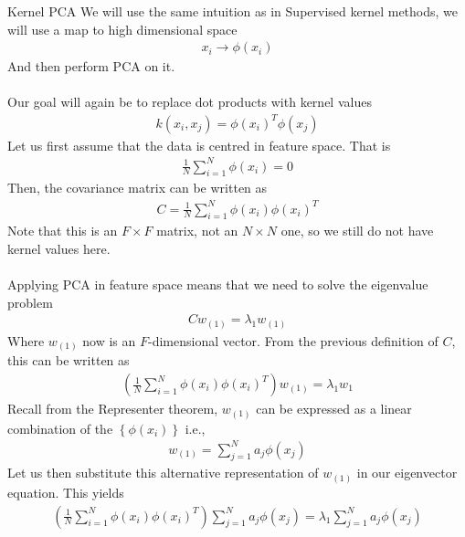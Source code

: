\begin{parag}{Kernel PCA}
    We will use the same intuition as in Supervised kernel methods, we will use a map to high dimensional space
	\begin{align*} 
		x_i \to \phi(x_i)
	\end{align*}
	And then perform PCA on it.\\
	$ $\\
	Our goal will again be to replace dot products with kernel values 
	\begin{align*} 
		k\left(x_i, x_j\right) = \phi\left(x_i\right)^{T}\phi\left(x_j\right)
	\end{align*}
	Let us first assume that the data is centred in feature space. That is 
	\begin{align*} 
		\frac{1}{N} \sum_{i= 1}^{N}\phi\left(x_i\right) = 0
	\end{align*}
	Then, the covariance matrix can be written as 
	\begin{align*} 
		C = \frac{1}{N} \sum_{i= 1}^{N}\phi\left(x_i\right)\phi\left(x_i\right)^{T}
	\end{align*}
	Note that this is an $F \times F$ matrix, not an $N \times N$ one, so we still do not have kernel values here.\\
	$ $\\
	Applying PCA in feature space means that we need to solve the eigenvalue problem 
	\begin{align*} 
		Cw_{\left(1\right)} = \lambda_1 w_{\left(1\right)}
	\end{align*}
	Where $w_{\left(1\right)}$ now is an $F$-dimensional vector. From the previous definition of $C$, this can be written as 
	\begin{align*} 
		\left(\frac{1}{N}\sum_{i= 1}^{N}\phi\left(x_i\right)\phi\left(x_i\right)^{T}\right)w_{\left(1\right)} = \lambda_1 w_{1}
	\end{align*}
	Recall from the Representer theorem, $w_{\left(1\right)}$ can be expressed as a linear combination of the $\left\{\phi\left(x_i\right)\right\}$ i.e.,  
	\begin{align*} 
		w_{\left(1\right)} = \sum_{j = 1}^{N}a_j \phi\left(x_j\right)
	\end{align*}
	Let us then substitute this alternative representation of $w_{\left(1\right)}$ in our eigenvector equation. This yields 
	\begin{align*} 
		\left(\frac{1}{N}\sum_{i= 1}^{N}\phi\left(x_i\right)\phi\left(x_i\right)^{T}\right)\sum_{j= 1}^{N}a_j \phi\left(x_j\right) = \lambda_1 \sum_{j= 1}^{N}a_j \phi\left(x_j\right)

\end{align*}
\end{parag}
